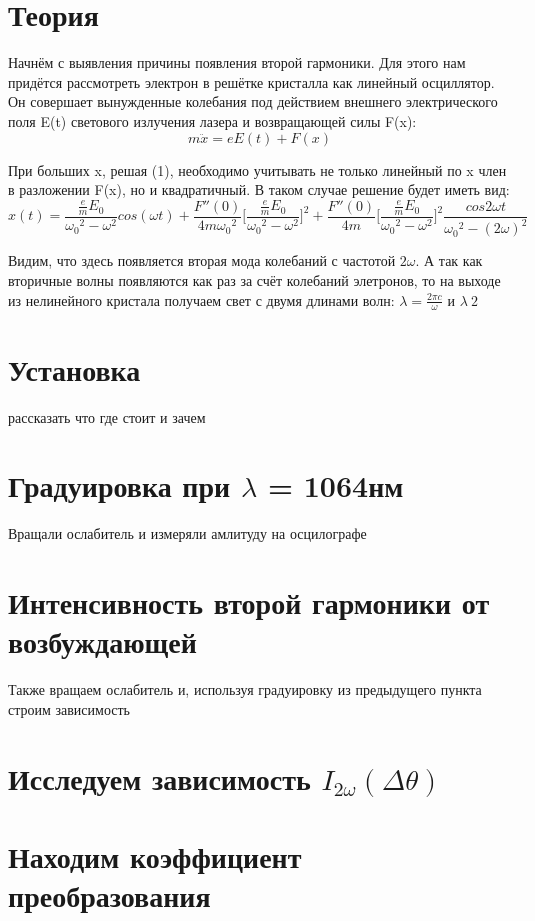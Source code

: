 \documentclass[a4paper,14pt]{article} %
\begin{document}


\newpage

\section{Теория}
Начнём с выявления причины появления второй гармоники. Для этого нам придётся рассмотреть электрон в решётке кристалла как линейный осциллятор. Он совершает вынужденные колебания под действием внешнего электрического поля E(t) светового излучения лазера и возвращающей силы F(x):\\
\begin{equation}
m \ddot{x} = e E(t) + F(x)
\end{equation}

При больших x, решая (1), необходимо учитывать не только линейный по x член в разложении F(x), но и квадратичный. В таком случае решение будет иметь вид:
\begin{equation}
x(t) = \frac{\frac{e}{m} E_0}{{\omega_0}^2 - {\omega}^2} cos(\omega t) 
+ \frac{F''(0)}{4m {\omega_0}^2} \Big[\frac{\frac{e}{m} E_0}{{\omega_0}^2 - {\omega}^2}\Big]^2
+ \frac{F''(0)}{4m} \Big[\frac{\frac{e}{m} E_0}{{\omega_0}^2 - {\omega}^2}\Big]^2
\frac{cos2\omega t}{{\omega_0}^2 - (2 \omega)^2}
\end{equation}

Видим, что здесь появляется вторая мода колебаний с частотой $2 \omega$. А так как вторичные волны появляются как раз за счёт колебаний элетронов, то на выходе из нелинейного кристала получаем свет с двумя длинами волн: $\lambda = \frac{2 \pi c}{\omega}$ и $\lambda \ 2$

\section{Установка}
рассказать что где стоит и зачем

\section{Градуировка при $\lambda$ = 1064нм}
Вращали ослабитель и измеряли амлитуду на осцилографе

\section{Интенсивность второй гармоники от возбуждающей}
Также вращаем ослабитель и, используя градуировку из предыдущего пункта строим зависимость

\section{Исследуем зависимость $I_{2\omega} (\Delta \theta)$}

\section{Находим коэффициент преобразования}
\end{document}
